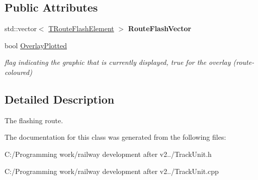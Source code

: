 \subsection*{Public Attributes}
\begin{DoxyCompactItemize}
\item 
\mbox{\label{class_t_one_route_1_1_t_route_flash_a5f8fe40f85bdc87247848d2d98685815}} 
std\+::vector$<$ \mbox{\hyperlink{class_t_one_route_1_1_t_route_flash_element}{T\+Route\+Flash\+Element}} $>$ {\bfseries Route\+Flash\+Vector}
\item 
\mbox{\label{class_t_one_route_1_1_t_route_flash_acc9544214464de94df8becea93062c62}} 
bool \mbox{\hyperlink{class_t_one_route_1_1_t_route_flash_acc9544214464de94df8becea93062c62}{Overlay\+Plotted}}
\begin{DoxyCompactList}\small\item\em flag indicating the graphic that is currently displayed, true for the overlay (route-\/coloured) \end{DoxyCompactList}\end{DoxyCompactItemize}


\subsection{Detailed Description}
The flashing route. 

The documentation for this class was generated from the following files\+:\begin{DoxyCompactItemize}
\item 
C\+:/\+Programming work/railway development after v2../Track\+Unit.\+h\item 
C\+:/\+Programming work/railway development after v2../Track\+Unit.\+cpp\end{DoxyCompactItemize}
